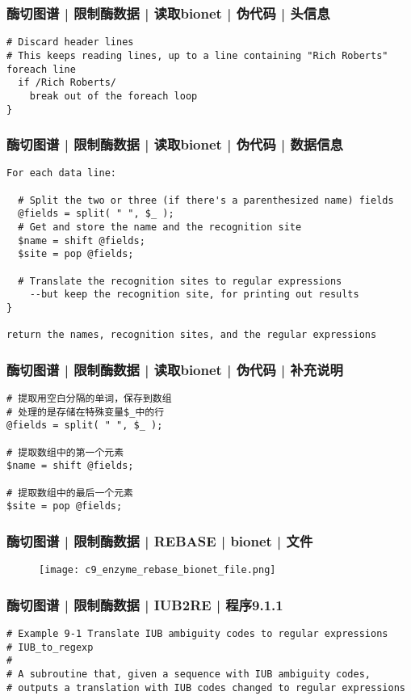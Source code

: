 \begin{frame}[fragile]
  \frametitle{酶切图谱 | 限制酶数据 | 读取bionet | 伪代码 | 头信息}
\begin{lstlisting}
# Discard header lines
# This keeps reading lines, up to a line containing "Rich Roberts"
foreach line 
  if /Rich Roberts/ 
    break out of the foreach loop
}
\end{lstlisting}
\end{frame}


\begin{frame}[fragile]
  \frametitle{酶切图谱 | 限制酶数据 | 读取bionet | 伪代码 | 数据信息}
  \vspace{-0.6em}
\begin{lstlisting}[basicstyle=\small\tt]
For each data line:

  # Split the two or three (if there's a parenthesized name) fields
  @fields = split( " ", $_ );
  # Get and store the name and the recognition site
  $name = shift @fields;
  $site = pop @fields;

  # Translate the recognition sites to regular expressions
    --but keep the recognition site, for printing out results
}

return the names, recognition sites, and the regular expressions
\end{lstlisting}
\end{frame}

\begin{frame}[fragile]
  \frametitle{酶切图谱 | 限制酶数据 | 读取bionet | 伪代码 | \alert{补充说明}}
\begin{lstlisting}
# 提取用空白分隔的单词，保存到数组
# 处理的是存储在特殊变量$_中的行
@fields = split( " ", $_ );

# 提取数组中的第一个元素
$name = shift @fields;

# 提取数组中的最后一个元素
$site = pop @fields;
\end{lstlisting}
\end{frame}

\begin{frame}
  \frametitle{酶切图谱 | 限制酶数据 | REBASE | bionet | 文件}
  \begin{figure}
    \centering
    \texttt{[image: c9\_enzyme\_rebase\_bionet\_file.png]}
  \end{figure}
\end{frame}

\begin{frame}[fragile]
  \frametitle{酶切图谱 | 限制酶数据 | IUB2RE | 程序9.1.1}
\begin{lstlisting}
# Example 9-1 Translate IUB ambiguity codes to regular expressions
# IUB_to_regexp
#
# A subroutine that, given a sequence with IUB ambiguity codes,
# outputs a translation with IUB codes changed to regular expressions
\end{lstlisting}
\end{frame}

